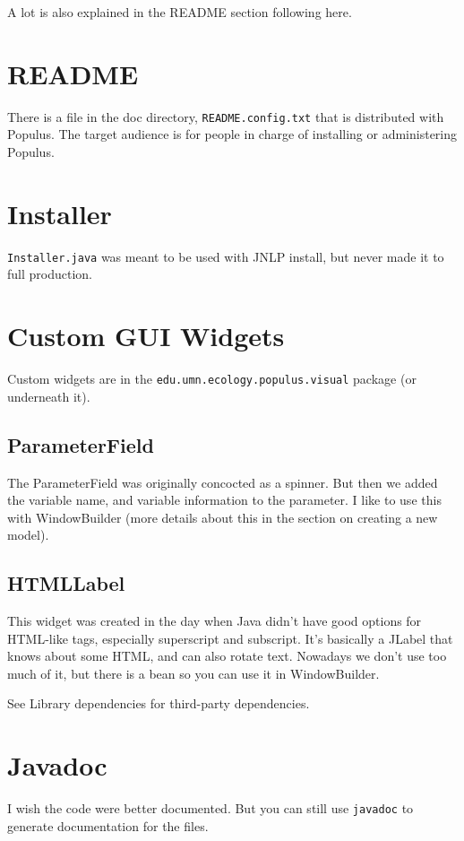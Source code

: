 \documentclass[12pt]{article}
\begin{document}
A lot is also explained in the README section following here.

\section{README}

There is a file in the doc directory, \texttt{README.config.txt} that is distributed with Populus.  The target audience is for people in charge of installing or administering Populus.

\section{Installer}
\texttt{Installer.java} was meant to be used with JNLP install, but never made it to full production.

\section{Custom GUI Widgets}

Custom widgets are in the \texttt{edu.umn.ecology.populus.visual} package (or underneath it).

\subsection{ParameterField}
The ParameterField was originally concocted as a spinner.  But then we added the variable name, and variable information to the parameter.  I like to use this with WindowBuilder (more details about this in the section on creating a new model).

\subsection{HTMLLabel}
This widget was created in the day when Java didn't have good options for HTML-like tags, especially superscript and subscript.  It's basically a JLabel that knows about some HTML, and can also rotate text.  Nowadays we don't use too much of it, but there is a bean so you can use it in WindowBuilder.

See Library dependencies for third-party dependencies.

\section{Javadoc}

I wish the code were better documented.  But you can still use \texttt{javadoc} to generate documentation for the files.
\end{document}
